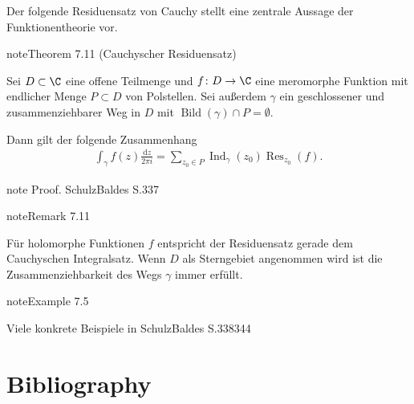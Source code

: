 \documentclass[letterpaper,10pt,german]{jupyterBook}
\begin{document}
\sphinxAtStartPar
Der folgende Residuensatz von Cauchy stellt eine zentrale Aussage der Funktionentheorie vor.
\label{complexanalysis/residuensatz:theorem-14}
\begin{sphinxadmonition}{note}{Theorem 7.11 (Cauchyscher Residuensatz)}



\sphinxAtStartPar
Sei \(D \subset \C\) eine offene Teilmenge und \(f \colon D \rightarrow \C\) eine meromorphe Funktion mit endlicher Menge \(P \subset D\) von Polstellen.
Sei außerdem \(\gamma\) ein geschlossener und zusammenziehbarer Weg in \(D\) mit \(\operatorname{Bild}(\gamma) \cap P = \emptyset\).

\sphinxAtStartPar
Dann gilt der folgende Zusammenhang
\begin{equation*}
\begin{split}\int_\gamma f(z) \frac{\mathrm{d}z}{2\pi i} = \sum_{z_0 \in P} \operatorname{Ind}_\gamma(z_0) \operatorname{Res}_{z_0}(f).\end{split}
\end{equation*}\end{sphinxadmonition}

\begin{sphinxadmonition}{note}
\sphinxAtStartPar
Proof. Schulz\sphinxhyphen{}Baldes S.337
\end{sphinxadmonition}
\label{complexanalysis/residuensatz:remark-15}
\begin{sphinxadmonition}{note}{Remark 7.11}



\sphinxAtStartPar
Für holomorphe Funktionen \(f\) entspricht der Residuensatz gerade dem Cauchyschen Integralsatz.
Wenn \(D\) als Sterngebiet angenommen wird ist die Zusammenziehbarkeit des Wegs \(\gamma\) immer erfüllt.
\end{sphinxadmonition}
\label{complexanalysis/residuensatz:example-16}
\begin{sphinxadmonition}{note}{Example 7.5}



\sphinxAtStartPar
Viele konkrete Beispiele in Schulz\sphinxhyphen{}Baldes S.338\sphinxhyphen{}344
\end{sphinxadmonition}


\chapter{Bibliography}
\label{\detokenize{references:bibliography}}\label{\detokenize{references::doc}}
\sphinxAtStartPar
\end{document}
